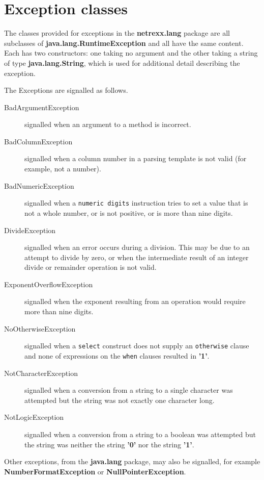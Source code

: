 \chapter{Exception classes}\label{"id"}
 
The classes provided for exceptions in the \textbf{netrexx.lang} package
are all subclasses of \textbf{java.lang.RuntimeException} and all have
the same content.  Each has two constructors: one taking no argument and
the other taking a string of type \textbf{java.lang.String}, which is
used for additional detail describing the exception.
 
The Exceptions are signalled as follows.
\begin{description}
\item[BadArgumentException]\label{refexpbae}
 signalled when an argument to a method is incorrect.
\item[BadColumnException]\label{refexpbce}
 signalled when a column number in a parsing template is not valid
(for example, not a number).
\item[BadNumericException]\label{refexpbne}
 signalled when a \texttt{numeric digits} instruction tries to set
a value that is not a whole number, or is not positive, or is more than
nine digits.
\item[DivideException]\label{refexpdve}
 signalled when an error occurs during a division.  This may be due
to an attempt to divide by zero, or when the intermediate result of an
integer divide or remainder operation is not valid.
\item[ExponentOverflowException]\label{refexpeoe}
 signalled when the exponent resulting from an operation would
require more than nine digits.
\item[NoOtherwiseException]\label{refexpnoe}
 signalled when a \texttt{select} construct does not supply an
\texttt{otherwise} clause and none of expressions on the \texttt{when}
clauses resulted in \textbf{'1'}.
\item[NotCharacterException]\label{refexpnce}
 signalled when a conversion from a string to a single character was
attempted but the string was not exactly one character long.
\item[NotLogicException]\label{refexpnle}
 signalled when a conversion from a string to a boolean was
attempted but the string was neither the string \textbf{'0'} nor the
string \textbf{'1'}.
\end{description}
 
Other exceptions, from the \textbf{java.lang} package, may also be
signalled, for example \textbf{NumberFormatException}
or \textbf{NullPointerException}.
